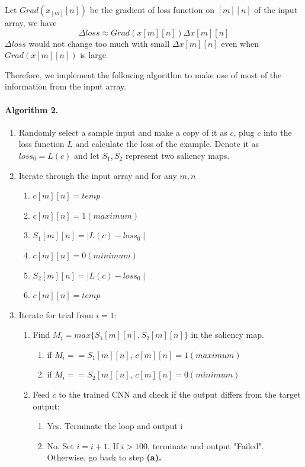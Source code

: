 \documentclass{article}
\begin{document}
Let $Grad(x_[m][n])$ be the gradient of loss function on $[m][n]$ of the input array, we have 
\begin{equation}
	\Delta loss \approx Grad(x[m][n])\Delta x[m][n]
\end{equation}
$\Delta loss$ would not change too much with small $\Delta x[m][n]$ even when $Grad(x[m][n])$ is large.

Therefore, we implement the following algorithm to make use of most of the information from the input array.

\paragraph{Algorithm 2.}
\begin{enumerate}
	\item Randomly select a sample input and make a copy of it as $c$, plug $c$ into the loss function $L$ and calculate the loss of the example. Denote it as $loss_0=L(c)$ and let $S_1,S_2$ represent two saliency maps.
	\item Iterate through the input array and for any $m,n$
		\begin{enumerate}
			\item $c[m][n]=temp$
			\item $c[m][n]=1(maximum)$
			\item $S_1[m][n]= \mid L(c) - loss_0 \mid$
			\item $c[m][n]=0(minimum)$
			\item $S_2[m][n]=\mid L(c) - loss_0 \mid$
			\item $c[m][n]=temp$
		\end{enumerate}

	\item Iterate for trial from $i=1$:
		\begin{enumerate}
			\item Find $M_i=max\{S_1[m][n],S_2[m][n]\}$ in the saliency map.
				\begin{enumerate}
					\item if $M_i==S_1[m][n]$, $c[m][n]=1(maximum)$
					\item if $M_i==S_2[m][n]$, $c[m][n]=0(minimum)$
				\end{enumerate}
			\item Feed $c$ to the trained CNN and check if the output differs from the target output:
				\begin{enumerate}
					\item Yes. Terminate the loop and output i
					\item No. Set $i=i+1$. If $i > 100$, terminate and output "Failed". Otherwise, go back to step \textbf{(a).}
				\end{enumerate}
		\end{enumerate}
\end{enumerate}
\end{document}
